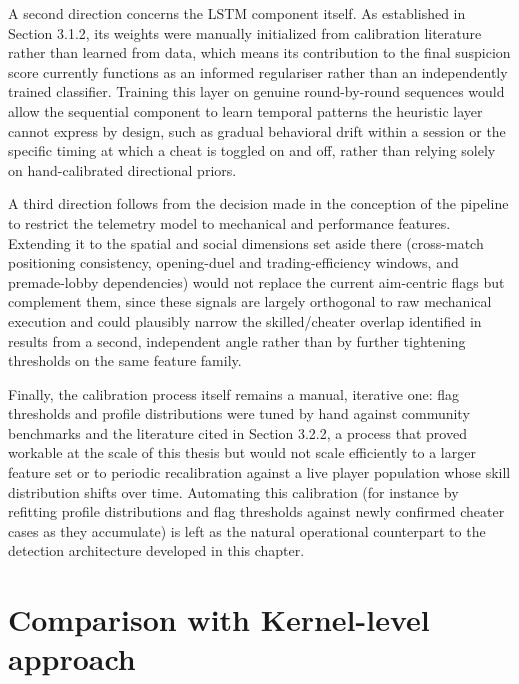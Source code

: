 A second direction concerns the LSTM component itself. As established in Section 3.1.2, its weights were manually initialized from calibration literature rather than learned from data, which means its contribution to the final suspicion score currently functions as an informed regulariser rather than an independently trained classifier. Training this layer on genuine round-by-round sequences would allow the sequential component to learn temporal patterns the heuristic layer cannot express by design, such as gradual behavioral drift within a session or the specific timing at which a cheat is toggled on and off, rather than relying solely on hand-calibrated directional priors.

A third direction follows from the decision made in the conception of the pipeline to restrict the telemetry model to mechanical and performance features. Extending it to the spatial and social dimensions set aside there (cross-match positioning consistency, opening-duel and trading-efficiency windows, and premade-lobby dependencies) would not replace the current aim-centric flags but complement them, since these signals are largely orthogonal to raw mechanical execution and could plausibly narrow the skilled/cheater overlap identified in results from a second, independent angle rather than by further tightening thresholds on the same feature family.

Finally, the calibration process itself remains a manual, iterative one: flag thresholds and profile distributions were tuned by hand against community benchmarks and the literature cited in Section 3.2.2, a process that proved workable at the scale of this thesis but would not scale efficiently to a larger feature set or to periodic recalibration against a live player population whose skill distribution shifts over time. Automating this calibration (for instance by refitting profile distributions and flag thresholds against newly confirmed cheater cases as they accumulate) is left as the natural operational counterpart to the detection architecture developed in this chapter.

\section{Comparison with Kernel-level approach}
\label{sec:three:five}

